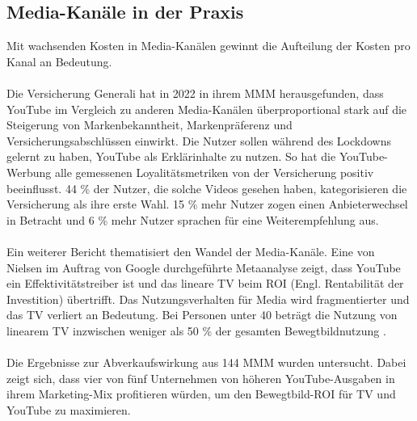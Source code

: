 \subsection{Media-Kanäle in der Praxis}
\label{MediaKanäleInDerPraxis}
Mit wachsenden Kosten in Media-Kanälen gewinnt die Aufteilung der Kosten pro Kanal an Bedeutung. \\\\
Die Versicherung Generali hat in 2022 in ihrem \ac{MMM} herausgefunden, dass YouTube im Vergleich zu anderen Media-Kanälen überproportional stark auf die Steigerung von Markenbekanntheit, Markenpräferenz und Versicherungsabschlüssen einwirkt\cite{DasZusammenspielKundenloyalität2022}. Die Nutzer sollen während des Lockdowns gelernt zu haben, YouTube als Erklärinhalte zu nutzen. So hat die YouTube-Werbung alle gemessenen Loyalitätsmetriken von der Versicherung positiv beeinflusst. 44 \% der Nutzer, die solche Videos gesehen haben, kategorisieren die Versicherung als ihre erste Wahl. 15 \% mehr Nutzer zogen einen Anbieterwechsel in Betracht und 6 \% mehr Nutzer sprachen für eine Weiterempfehlung aus\cite{DasZusammenspielKundenloyalität2022}. \\\\
Ein weiterer Bericht thematisiert den Wandel der Media-Kanäle. Eine von Nielsen im Auftrag von Google durchgeführte Metaanalyse zeigt, dass YouTube ein Effektivitätstreiber ist und das lineare TV beim \ac{ROI} (Engl. Rentabilität der Investition) übertrifft. Das Nutzungsverhalten für Media wird fragmentierter und das TV verliert an Bedeutung. Bei Personen unter 40 beträgt die Nutzung von linearem TV inzwischen weniger als 50 \% der gesamten Bewegtbildnutzung \cite{237097}.\\\\
Die Ergebnisse zur Abverkaufswirkung aus 144 \ac{MMM} wurden untersucht. Dabei zeigt sich, dass vier von fünf Unternehmen von höheren YouTube-Ausgaben in ihrem Marketing-Mix profitieren würden, um den Bewegtbild-ROI für TV und YouTube zu maximieren\cite{237097}. \\\\
